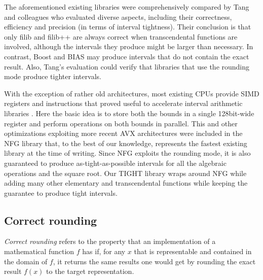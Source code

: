The aforementioned existing libraries were comprehensively compared by Tang and colleagues \cite{tang2022} who evaluated diverse aspects, including their correctness, efficiency and precision (in terms of interval tightness). Their conclusion is that only filib and filib++ are always correct when transcendental functions are involved, although the intervals they produce might be larger than necessary. In contrast, Boost and BIAS may produce intervals that do not contain the exact result. Also, Tang's evaluation could verify that libraries that use the rounding mode produce tighter intervals.

With the exception of rather old architectures, most existing CPUs provide SIMD registers and instructions that proved useful to accelerate interval arithmetic libraries \cite{lambov2008}. Here the basic idea is to store both the bounds in a single 128bit-wide register and perform operations on both bounds in parallel. This and other optimizations exploiting more recent AVX architectures were  included in the NFG library \cite{nfg} that, to the best of our knowledge, represents the fastest existing library at the time of writing. Since NFG exploits the rounding mode, it is also guaranteed to produce as-tight-as-possible intervals for all the algebraic operations and the square root. Our TIGHT library wraps around NFG while adding many other elementary and transcendental functions while keeping the guarantee to produce tight intervals.

\subsection{Correct rounding}
\emph{Correct rounding} refers to the property that an implementation
of a mathematical function $f$ has if, for any $x$ that is representable and contained in the domain of $f$, it returns the same results one would get by rounding the exact result $f(x)$ to the target representation.

